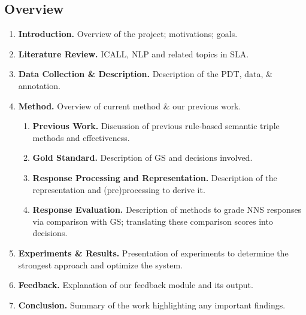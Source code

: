\documentclass[11pt]{article}
\begin{document}
\subsection{Overview}
\label{overview}
\begin{enumerate}
\item{\textbf{Introduction.} Overview of the project; motivations; goals.}
\item{\textbf{Literature Review.} ICALL, NLP and related topics in SLA.}
\item{\textbf{Data Collection \& Description.} Description of the PDT, data, \& annotation.}
\item{\textbf{Method.} Overview of current method \& our previous work. 
\begin{enumerate}
\item{\textbf{Previous Work.} Discussion of previous rule-based semantic triple methods and effectiveness.}
\item{\textbf{Gold Standard.} Description of GS and decisions involved.}
\item{\textbf{Response Processing and Representation.} Description of the representation and (pre)processing to derive it.} 
\item{\textbf{Response Evaluation.} Description of methods to grade NNS responses via comparison with GS; translating these comparison scores into decisions.} 
\end{enumerate}}
\item{\textbf{Experiments \& Results.}} Presentation of experiments to determine the strongest approach and optimize the system.
\item{\textbf{Feedback.} Explanation of our feedback module and its output.}
\item{\textbf{Conclusion.} Summary of the work highlighting any important findings.}
\end{enumerate}
\end{document}
